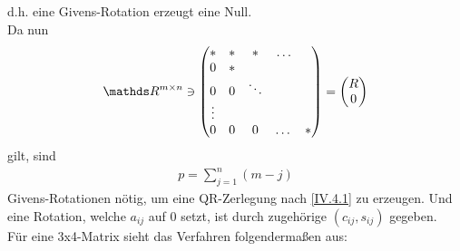 d.h. eine Givens-Rotation erzeugt eine Null.\\
Da nun
\begin{gather*}
\R^{m\times n}\ni \begin{pmatrix}
* & * &* & \dots   \\
0 & * &     \\
0 & 0 & \ddots \\
\vdots \\
0 & 0 & 0 & \dots & *		
\end{pmatrix}
= \begin{pmatrix} R\\0\end{pmatrix}
\end{gather*}
gilt, sind
\begin{gather*}
p=\sum_{j=1}^{n}(m-j)
\end{gather*}
Givens-Rotationen nötig, um eine QR-Zerlegung nach \eqref{IV.4.1} zu erzeugen.
Und eine Rotation, welche $a_{ij} $ auf 0 setzt, ist durch zugehörige 
$(c_{ij}, s_{ij}) $ gegeben.\\

Für eine 3x4-Matrix sieht das Verfahren folgendermaßen aus:

